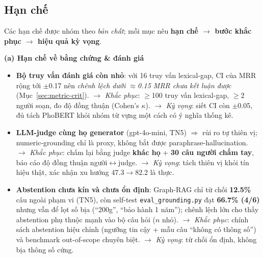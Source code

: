 \documentclass[12pt,a4paper]{article}
\begin{document}
\subsection{Hạn chế}
Các hạn chế được nhóm theo \textit{bản chất}; mỗi mục nêu \textbf{hạn chế $\to$ bước khắc phục $\to$ hiệu quả kỳ vọng}.

\smallskip\noindent\textbf{(a) Hạn chế về bằng chứng \& đánh giá}
\begin{itemize}[leftmargin=1.5cm,itemsep=2pt]
  \item \textbf{Bộ truy vấn đánh giá còn nhỏ}: với 16 truy vấn lexical-gap, CI của MRR rộng tới $\pm$0.17 nên \textit{chênh lệch dưới $\approx$0.15 MRR chưa kết luận được} (Mục~\ref{sec:metric-crit}). $\to$ \textit{Khắc phục}: $\geq$100 truy vấn lexical-gap, $\geq$2 người soạn, đo độ đồng thuận (Cohen's $\kappa$). $\to$ \textit{Kỳ vọng}: siết CI còn $\pm$0.05, đủ tách PhoBERT khỏi nhóm từ vựng một cách có ý nghĩa thống kê.
  \item \textbf{LLM-judge cùng họ generator} (gpt-4o-mini, TN5) $\Rightarrow$ rủi ro tự thiên vị; numeric-grounding chỉ là proxy, không bắt được paraphrase-hallucination. $\to$ \textit{Khắc phục}: chấm lại bằng judge \textbf{khác họ} + \textbf{30 câu người chấm tay}, báo cáo độ đồng thuận người$\leftrightarrow$judge. $\to$ \textit{Kỳ vọng}: tách thiên vị khỏi tín hiệu thật, xác nhận xu hướng 47.3$\to$82.2 là thực.
  \item \textbf{Abstention chưa kín và chưa ổn định}: Graph-RAG chỉ từ chối \textbf{12.5\%} câu ngoài phạm vi (TN5), còn self-test \texttt{eval\_grounding.py} đạt \textbf{66.7\% (4/6)} nhưng vẫn để lọt số bịa (``200g'', ``bảo hành 1 năm''); chênh lệch lớn cho thấy abstention phụ thuộc mạnh vào bộ câu hỏi ($n$ nhỏ). $\to$ \textit{Khắc phục}: chính sách abstention hiệu chỉnh (ngưỡng tin cậy + mẫu câu ``không có thông số'') và benchmark out-of-scope chuyên biệt. $\to$ \textit{Kỳ vọng}: từ chối ổn định, không bịa thông số cứng.
\end{itemize}
\end{document}

